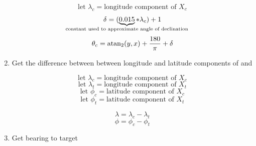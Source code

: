 \begin{enumerate}
          \large $$ \text{let } \lambda_c = \text{longitude component of } X_c $$
          \large $$ \delta = (\underbrace{0.015}_{\mathclap {\text{constant used to approximate angle of declination}}} * \lambda_c) + 1 $$
          \large $$ \theta_c = \operatorname{atan_2}(y, x) + \frac{180}{\pi} + \delta $$


  \item Get the difference between between longitude and latitude components of \cLoc and \tLoc

        \small   $$ \text{let } \lambda_c = \text{longitude component of } X_c $$
        \small   $$ \text{let } \lambda_t = \text{longitude component of } X_t $$
        \small   $$ \text{let } \phi_c = \text{latitude component of } X_c $$
        \small   $$ \text{let } \phi_t = \text{latitude component of } X_t $$

        \large  $$ \lambda = \lambda_c - \lambda_t $$
        \large $$ \phi = \phi_c - \phi_t $$
  
  \item Get bearing \bearing to target
\end{enumerate}